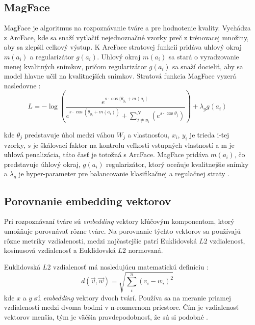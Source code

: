 \subsection{MagFace}
MagFace je algoritmus na rozpoznávanie tváre a pre hodnotenie kvality. Vychádza z ArcFace, kde sa snaží vytlačiť nejednoznačné vzorky preč z trénovacej množiny, aby sa zlepšil celkový výstup. K ArcFace stratovej funkcií pridáva uhlový okraj $m(a_i)$ a regularizátor $g(a_i)$. Uhlový okraj $m(a_i)$ sa stará o vyradzovanie menej kvalitných snímkov, pričom regularizátor $g(a_i)$ sa snaží docieliť, aby sa model hlavne učil na kvalitnejších snímkov. Stratová funkcia MagFace vyzerá nasledovne \cite{magface}:
\begin{equation}
    L = -\log \left( \frac{e^{s \cdot \cos(\theta_{y_i} + m(a_i)}}{e^{s \cdot \cos(\theta_{y_i} + m(a_i))} + \sum^N_{j \neq y_i} ( e^{s \cdot \cos \theta_{j}}) } \right) + \lambda_g g(a_i)
    \label{eq:magface_loss}
\end{equation}

kde $\theta_{j}$ predstavuje úhol medzi váhou $W_j$ a vlastnosťou, $x_i$, $y_i$ je trieda i-tej vzorky, $s$ je škálovací faktor na kontrolu veľkosti vstupných vlastností a m je uhlová penalizácia, táto časť je totožná s ArcFace. MagFace pridáva $m(a_i)$, čo predstavuje úhlový okraj, $g(a_i)$ regularizátor, ktorý oceňuje kvalitnejšie snímky a $\lambda_g$ je hyper-parameter pre balancovanie klasifikačnej a regulačnej straty \cite{magface}.

\subsection{Porovnanie embedding vektorov} \label{vektory}
Pri rozpoznávaní tváre sú \textit{embedding} vektory kľúčovým komponentom, ktorý umožňuje porovnávať rôzne tváre. Na porovnanie týchto vektorov sa používajú rôzne metriky vzdialenosti, medzi najčastejšie patrí Euklidovská $L2$ vzdialenosť, kosínusová vzdialenosť a Euklidovská $L2$ normovaná.

Euklidovská $L2$ vzdialenosť má nasledujúcu matematickú definíciu \cite{distance_embedding}:
\begin{equation}
    d(\overrightarrow{v}, \overrightarrow{w}) = \sqrt{\sum_{i}^{n} (v_i - w_i)^2}
    \label{eq:l2}
\end{equation}
kde $x$ a $y$ sú \textit{embedding} vektory dvoch tvárí. Používa sa na meranie priamej vzdialenosti medzi dvoma bodmi v n-rozmernom priestore. Čím je vzdialenosť vektorov menšia, tým je väčšia pravdepodobnosť, že sú si podobné \cite{distance_embedding}.

